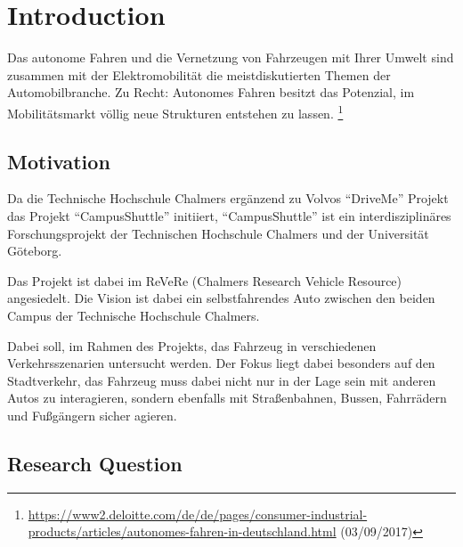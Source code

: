 \chapter{Introduction}

Das autonome Fahren und die Vernetzung von Fahrzeugen mit Ihrer Umwelt sind zusammen mit der Elektromobilität die meistdiskutierten Themen der Automobilbranche.
Zu Recht: Autonomes Fahren besitzt das Potenzial, im Mobilitätsmarkt völlig neue Strukturen entstehen zu lassen.
\footnote{\url{https://www2.deloitte.com/de/de/pages/consumer-industrial-products/articles/autonomes-fahren-in-deutschland.html} (03/09/2017)}

\section{Motivation}

Da die Technische Hochschule Chalmers ergänzend zu Volvos “DriveMe” Projekt das Projekt
“CampusShuttle” initiiert, “CampusShuttle” ist ein interdisziplinäres Forschungsprojekt
der Technischen Hochschule Chalmers und der Universität Göteborg.

Das Projekt ist dabei im ReVeRe (Chalmers Research Vehicle Resource) angesiedelt. Die Vision ist dabei ein selbstfahrendes
Auto zwischen den beiden Campus der Technische Hochschule Chalmers.

Dabei soll, im Rahmen des Projekts, das Fahrzeug in verschiedenen Verkehrsszenarien untersucht
werden. Der Fokus liegt dabei besonders auf den Stadtverkehr, das Fahrzeug muss dabei nicht
nur in der Lage sein mit anderen Autos zu interagieren, sondern ebenfalls mit Straßenbahnen,
Bussen, Fahrrädern und Fußgängern sicher agieren. 

\section{Research Question}